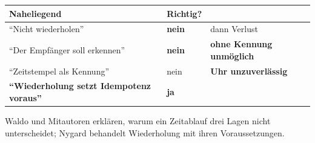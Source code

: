 \begin{warnung}
\begin{center}
\renewcommand{\arraystretch}{1.5}
\begin{tabular}{@{}P{3.2cm}P{2.2cm}P{2.4cm}@{}}
\toprule
\textbf{Naheliegend} & \textbf{Richtig?} & \\
\midrule
\enquote{Nicht wiederholen} & \textcolor{akzent}{\textbf{nein}} & \textcolor{akzent}{dann Verlust}\\
\enquote{Der Empfänger soll erkennen} & \textcolor{akzent}{\textbf{nein}} & \textbf{ohne Kennung unmöglich}\\
\enquote{Zeitstempel als Kennung} & \textcolor{akzent}{nein} & \textcolor{akzent}{\textbf{Uhr unzuverlässig}}\\
\textbf{\enquote{Wiederholung setzt Idempotenz voraus}} & \textcolor{gruen}{\textbf{ja}} & \\
\bottomrule
\end{tabular}
\end{center}

\begin{center}
\begin{minipage}{0.88\textwidth}
\end{minipage}
\end{center}

\begin{center}
\end{center}
\end{warnung}
\vspace{-4pt}
\noindent Waldo und Mit\-au\-to\-ren erklären, warum ein Zeit\-ab\-lauf drei Lagen nicht un\-ter\-schei\-det; Nygard behandelt Wie\-der\-ho\-lung mit ihren Vor\-aus\-set\-zun\-gen.
